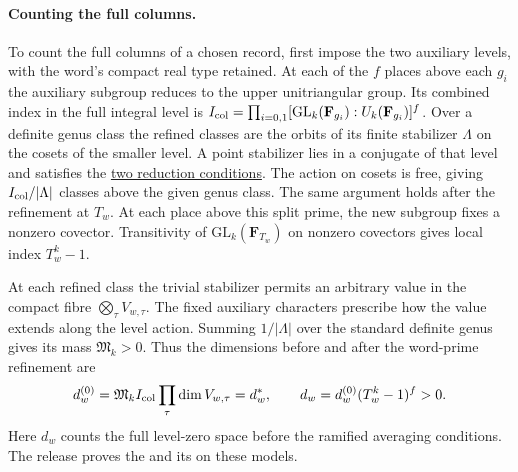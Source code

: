 \paragraph{Counting the full columns.}
\leavevmode{}%
\leavevmode{}%
To count the full columns of a chosen record, first impose the two
auxiliary levels, with the word's compact real type retained. At
each of the \(f\) places above each \(g_i\) the auxiliary subgroup
reduces to the upper unitriangular group. Its combined index in the
full integral level is
\(I_{\rm col}=\prod_{i=0,1}[\mathrm{GL}_k(\mathbf F_{g_i}):
U_k(\mathbf F_{g_i})]^f\).
Over a definite genus class the refined classes are the orbits of
its finite stabilizer \(\Lambda\) on the cosets of the smaller level.
A point stabilizer lies in a conjugate of that level and satisfies
the \hyperlink{proof.two-level-stabilizers}{two reduction conditions}.
The action on cosets is free, giving \(I_{\rm col}/|\Lambda|\)
classes above the given genus class.
The same argument holds after the refinement at \(T_w\). At each
place above this split prime, the new subgroup fixes a nonzero
covector. Transitivity of \(\mathrm{GL}_k(\mathbf F_{T_w})\) on
nonzero covectors gives local index \(T_w^k-1\).

At each refined class the trivial stabilizer permits an arbitrary
value in the compact fibre \(\bigotimes_\tau V_{w,\tau}\). The fixed
auxiliary characters prescribe how the value extends along the level
action. Summing \(1/|\Lambda|\) over the standard definite genus gives
its mass \(\mathfrak M_k>0\). Thus the dimensions before and after
the word-prime refinement are
\begin{equation}
 \label{eq:trace-column-dimensions}
 d_w^{(0)}=\mathfrak M_k I_{\rm col}\prod_\tau\dim V_{w,\tau}=d_w^*,
 \qquad d_w=d_w^{(0)}(T_w^k-1)^f>0.
\end{equation}
Here \(d_w\) counts the full level-zero space before the ramified
averaging conditions. The release proves the
and its
on these models.

